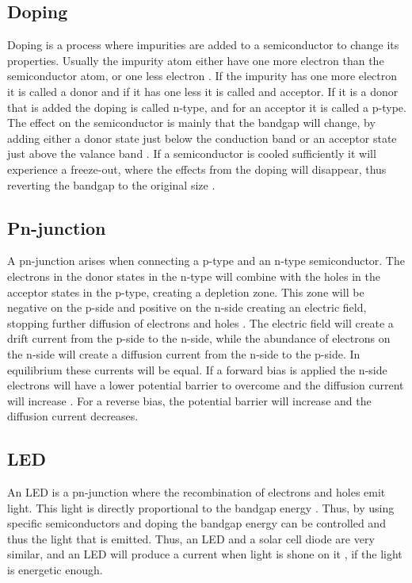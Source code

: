 \subsection{Doping}
Doping is a process where impurities are added to a semiconductor to change its properties. Usually the impurity atom either have one more electron than the semiconductor atom, or one less electron \cite{hofmann2015}. If the impurity has one more electron it is called a donor and if it has one less it is called and acceptor. If it is a donor that is added the doping is called n-type, and for an acceptor it is called a p-type. The effect on the semiconductor is mainly that the bandgap will change, by adding either a donor state just below the conduction band or an acceptor state just above the valance band \cite{hofmann2015}. If a semiconductor is cooled sufficiently it will experience a freeze-out, where the effects from the doping will disappear, thus reverting the bandgap to the original size \cite{hofmann2015}.

\subsection{Pn-junction}
A pn-junction arises when connecting a p-type and an n-type semiconductor. The electrons in the donor states in the n-type will combine with the holes in the acceptor states in the p-type, creating a depletion zone. This zone will be negative on the p-side and positive on the n-side creating an electric field, stopping further diffusion of electrons and holes \cite{hofmann2015}. The electric field will create a drift current from the p-side to the n-side, while the abundance of electrons on the n-side will create a diffusion current from the n-side to the p-side. In equilibrium these currents will be equal. If a forward bias is applied the n-side electrons will have a lower potential barrier to overcome and the diffusion current will increase \cite{hofmann2015}. For a reverse bias, the potential barrier will increase and the diffusion current decreases.


\subsection{LED}
An LED is a pn-junction where the recombination of electrons and holes emit light. This light is directly proportional to the bandgap energy \cite{hofmann2015}. Thus, by using specific semiconductors and doping the bandgap energy can be controlled and thus the light that is emitted. Thus, an LED and a solar cell diode are very similar, and an LED will produce a current when light is shone on it \cite{hofmann2015}, if the light is energetic enough.